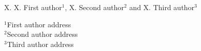 X. X. First author$^{1}$, X. Second author$^{2}$ and X. Third author$^{3}$

$^{1}$First author address\\
$^{2}$Second author address\\
$^{3}$Third author address